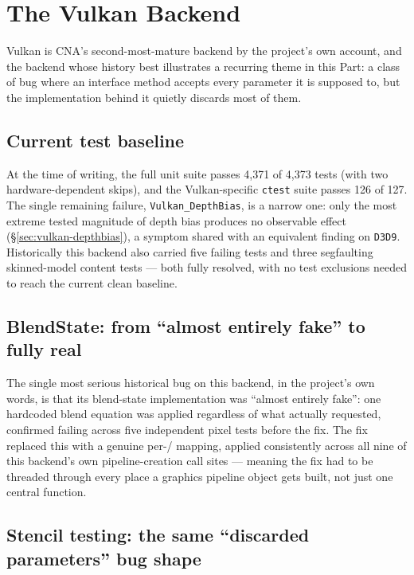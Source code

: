 \chapter{The Vulkan Backend}
\label{ch:vulkan-backend}

Vulkan is CNA's second-most-mature backend by the project's own account, and the backend
whose history best illustrates a recurring theme in this Part: a class of bug where an
interface method accepts every parameter it is supposed to, but the implementation behind it
quietly discards most of them.

\section{Current test baseline}

At the time of writing, the full unit suite passes 4{,}371 of 4{,}373 tests (with two
hardware-dependent skips), and the Vulkan-specific \texttt{ctest} suite passes 126 of 127.
The single remaining failure, \texttt{Vulkan\_DepthBias}, is a narrow one: only the most
extreme tested magnitude of depth bias produces no observable effect
(\S\ref{sec:vulkan-depthbias}), a symptom shared with an equivalent finding on
\texttt{D3D9}. Historically this backend also carried five failing 
tests and three segfaulting skinned-model content tests --- both fully resolved, with no
test exclusions needed to reach the current clean baseline.

\section{BlendState: from ``almost entirely fake'' to fully real}

The single most serious historical bug on this backend, in the project's own words, is that
its blend-state implementation was ``almost entirely fake'': one hardcoded blend equation was
applied regardless of what  actually requested, confirmed failing across
five independent pixel tests before the fix. The fix replaced this with a genuine
per-/ mapping, applied consistently across all nine
of this backend's own pipeline-creation call sites --- meaning the fix had to be threaded
through every place a graphics pipeline object gets built, not just one central function.

\section{Stencil testing: the same ``discarded parameters'' bug shape}

